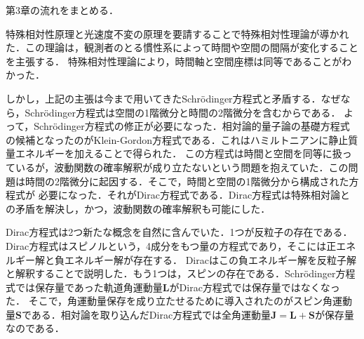 \documentclass{report}
\begin{document}
  第3章の流れをまとめる．
  \par
  特殊相対性原理と光速度不変の原理を要請することで特殊相対性理論が導かれた．この理論は，観測者のとる慣性系によって時間や空間の間隔が変化することを主張する．
  特殊相対性理論により，時間軸と空間座標は同等であることがわかった．
  \par 
  しかし，上記の主張は今まで用いてきたSchrödinger方程式と矛盾する．なぜなら，Schrödinger方程式は空間の1階微分と時間の2階微分を含むからである．
  よって，Schrödinger方程式の修正が必要になった．相対論的量子論の基礎方程式の候補となったのがKlein-Gordon方程式である．これはハミルトニアンに静止質量エネルギーを加えることで得られた．
  この方程式は時間と空間を同等に扱っているが，波動関数の確率解釈が成り立たないという問題を抱えていた．この問題は時間の2階微分に起因する．そこで，時間と空間の1階微分から構成された方程式が
  必要になった．それがDirac方程式である．Dirac方程式は特殊相対論との矛盾を解決し，かつ，波動関数の確率解釈も可能にした．
  \par
  Dirac方程式は2つ新たな概念を自然に含んでいた．1つが反粒子の存在である．Dirac方程式はスピノルという，4成分をもつ量の方程式であり，そこには正エネルギー解と負エネルギー解が存在する．
  Diracはこの負エネルギー解を反粒子解と解釈することで説明した．もう1つは，スピンの存在である．Schrödinger方程式では保存量であった軌道角運動量$\bm{L}$がDirac方程式では保存量ではなくなった．
  そこで，角運動量保存を成り立たせるために導入されたのがスピン角運動量$\bm{S}$である．相対論を取り込んだDirac方程式では全角運動量$\bm{J} = \bm{L} + \bm{S}$が保存量なのである．
\end{document}
